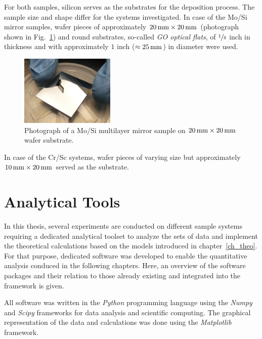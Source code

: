 For both samples, silicon serves as the substrates for the deposition process. The sample size and shape differ for the systems investigated. In case of the Mo/Si mirror samples, wafer pieces of approximately $\mm{20} \times \mm{20}$ (photograph shown in Fig.~\ref{ch_exp:fig_mosi_sample}) and round substrates, so-called \emph{GO optical flats}, of $\sfrac{1}{4}$ inch in thickness and with approximately $1$ inch ($\approx \mm{25}$) in diameter were used.
\begin{figure}[htb]
        \includegraphics[width=0.4\textwidth]{img/SAM_1910_v1}
        \caption[Mo/Si multilayer sample.]{%
            Photograph of a Mo/Si multilayer mirror sample on $\mm{20} \times \mm{20}$ wafer substrate.}
        \label{ch_exp:fig_mosi_sample}
\end{figure}
In case of the Cr/Sc systems, wafer pieces of varying size but approximately $\mm{10} \times \mm{20}$ served as the substrate.

\section{Analytical Tools}
In this thesis, several experiments are conducted on different sample systems requiring a dedicated analytical toolset to analyze the sets of data and implement the theoretical calculations based on the models introduced in chapter~\ref{ch_theo}. For that purpose, dedicated software was developed to enable the quantitative analysis conduced in the following chapters. Here, an overview of the software packages and their relation to those already existing and integrated into the framework is given.

All software was written in the \emph{Python} programming language using the \emph{Numpy} and \emph{Scipy} frameworks \cite{walt_numpy_2011} for data analysis and scientific computing. The graphical representation of the data and calculations was done using the \emph{Matplotlib} \cite{hunter_matplotlib:_2007} framework.

